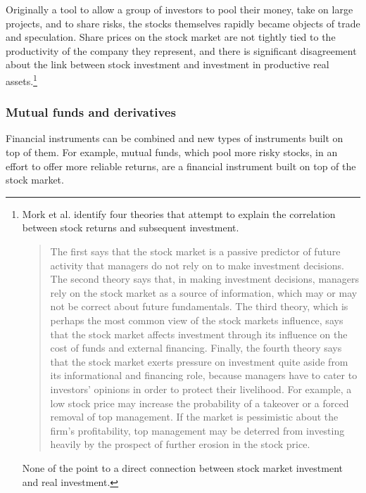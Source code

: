 Originally a tool to allow a group of investors to pool their money, take on large projects, and to share risks, the stocks themselves rapidly became objects of trade and speculation. Share prices on the stock market are not tightly tied to the productivity of the company they represent, %
and there is significant disagreement about the link between stock investment and investment in productive real assets.\footnote{Mork et al. \cite{morckStockMarketInvestment1990} identify four theories that attempt to explain the correlation between stock returns and subsequent investment. \begin{quotation}The first says that the stock market is a passive predictor of future activity that managers do not rely on to make investment decisions. The second theory says that, in making investment decisions, managers rely on the stock market as a source of information, which may or may not be correct about future fundamentals. The third theory, which is perhaps the most common view of the stock markets influence, says that the stock market affects investment through its influence on the cost of funds and external financing. Finally, the fourth theory says that the stock market exerts pressure on investment quite aside from its informational and financing role, because managers have to cater to investors' opinions in order to protect their livelihood. For example, a low stock price may increase the probability of a takeover or a forced removal of top management. If the market is pessimistic about the firm's profitability, top management may be deterred from investing heavily by the prospect of further erosion in the stock price.\end{quotation} None of the point to a direct connection between stock market investment and real investment.}

\subsubsection{Mutual funds and derivatives}
Financial instruments can be combined and new types of instruments built on top of them. For example,
mutual funds, which pool more risky stocks, in an effort to offer more reliable returns, are a financial instrument built on top of the stock market.


